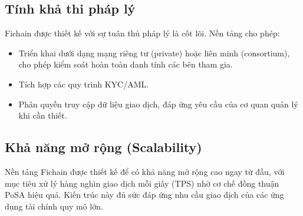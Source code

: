 \subsection{Tính khả thi pháp lý}
Fichain được thiết kế với sự tuân thủ pháp lý là cốt lõi. Nền tảng cho phép:
\begin{itemize}
    \item Triển khai dưới dạng mạng riêng tư (private) hoặc liên minh (consortium), cho phép kiểm soát hoàn toàn danh tính các bên tham gia.
    \item Tích hợp các quy trình KYC/AML.
    \item Phân quyền truy cập dữ liệu giao dịch, đáp ứng yêu cầu của cơ quan quản lý khi cần thiết.
\end{itemize}

\subsection{Khả năng mở rộng (Scalability)}
Nền tảng Fichain được thiết kế để có khả năng mở rộng cao ngay từ đầu, với mục tiêu xử lý hàng nghìn giao dịch mỗi giây (TPS) nhờ cơ chế đồng thuận PoSA hiệu quả. Kiến trúc này đủ sức đáp ứng nhu cầu giao dịch của các ứng dụng tài chính quy mô lớn.
